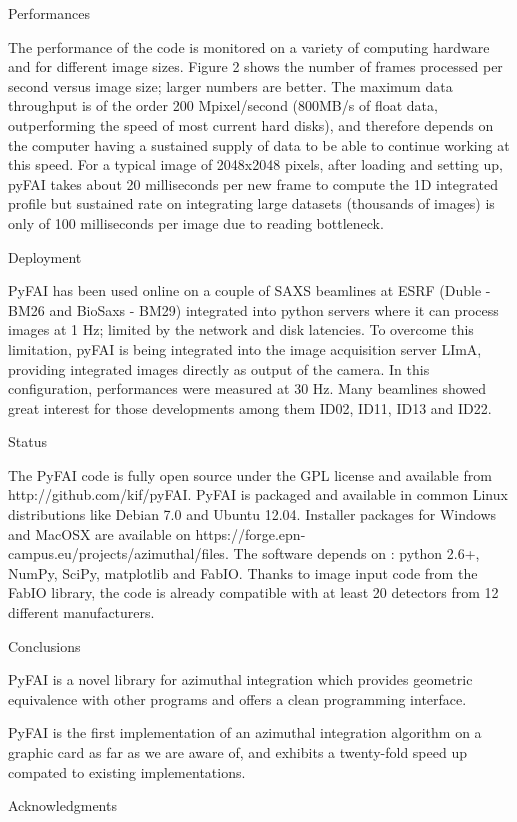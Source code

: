 Performances

The performance of the code is monitored on a variety of computing hardware and
for different image sizes. 
Figure 2 shows the number of frames processed per second versus image size; 
larger numbers are better.
The maximum data throughput is of the order 200 Mpixel/second (800MB/s of float
data, outperforming the speed of most current hard disks),
and therefore depends on the computer having a sustained supply of data to be able to continue working at this speed.
For a typical image of 2048x2048 pixels, after loading and setting up, pyFAI
takes about 20 milliseconds per new frame to compute the 1D integrated profile
but sustained rate on integrating large datasets (thousands of images) is only
of 100 milliseconds per image due to reading bottleneck.  
 
Deployment

PyFAI has been used online on a couple of SAXS beamlines at ESRF (Duble - BM26
and BioSaxs - BM29) integrated into python servers where it can process images
at 1 Hz; limited by the network and disk latencies.
To overcome this limitation, pyFAI is being integrated into the image
acquisition server LImA, providing integrated images directly as output of the
camera. In this configuration, performances were measured at 30 Hz.
Many beamlines showed great interest for those developments among them ID02,
ID11, ID13 and ID22. 

Status

The PyFAI code is fully open source under the GPL license and available from http://github.com/kif/pyFAI. 
PyFAI is packaged and available in common Linux distributions like Debian 7.0 and Ubuntu 12.04. 
Installer packages for Windows and MacOSX are available on https://forge.epn-campus.eu/projects/azimuthal/files. 
The software depends on : python 2.6+, NumPy, SciPy, matplotlib and FabIO. 
Thanks to image input code from the FabIO library, the code is already compatible with at least 20 detectors from 12 different manufacturers. 

Conclusions 

PyFAI is a novel library for azimuthal integration which provides
geometric equivalence with other programs and offers a clean programming
interface.

PyFAI is the first implementation of an azimuthal integration algorithm on a
graphic card as far as we are aware of, and exhibits a twenty-fold
speed up compated to existing implementations.

Acknowledgments

